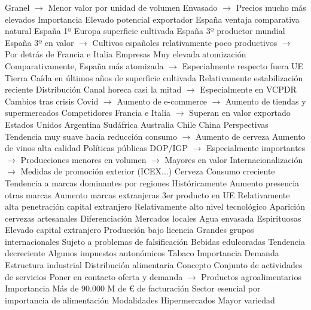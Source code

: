 \documentclass{nuevotema}
\begin{document}
\begin{esquemal}
				\4[] Granel
				\4[] $\to$ Menor valor por unidad de volumen
				\4[] Envasado
				\4[] $\to$ Precios mucho más elevados
				\4 Importancia
				\4[] Elevado potencial exportador
				\4[] España ventaja comparativa natural
				\4[] España 1º Europa superficie cultivada
				\4[] España 3º productor mundial
				\4[] España 3º en valor
				\4[] $\to$ Cultivos españoles relativamente poco productivos
				\4[] $\to$ Por detrás de Francia e Italia
				\4 Empresas
				\4[] Muy elevada atomización
				\4[] Comparativamente, España más atomizada
				\4[] $\to$ Especialmente respecto fuera UE
				\4 Tierra
				\4[] Caída en últimos años de superficie cultivada
				\4[] Relativamente estabilización reciente
				\4 Distribución
				\4[] Canal horeca casi la mitad
				\4[] $\to$ Especialmente en VCPDR
				\4[] Cambios tras crisis Covid
				\4[] $\to$ Aumento de e-commerce
				\4[] $\to$ Aumento de tiendas y supermercados
				\4 Competidores
				\4[] Francia e Italia
				\4[] $\to$ Superan en valor exportado
				\4[] Estados Unidos
				\4[] Argentina
				\4[] Sudáfrica
				\4[] Australia
				\4[] Chile
				\4[] China
				\4 Perspectivas
				\4[] Tendencia muy suave hacia reducción consumo
				\4[] $\to$ Aumento de cerveza
				\4[] Aumento de vinos alta calidad
				\4 Políticas públicas
				\4[] DOP/IGP
				\4[] $\to$ Especialmente importantes
				\4[] $\to$ Producciones menores en volumen
				\4[] $\to$ Mayores en valor
				\4[] Internacionalización
				\4[] $\to$ Medidas de promoción exterior (ICEX...)
			\3 Cerveza
				\4 Consumo creciente
				\4 Tendencia a marcas dominantes por regiones
				\4[] Históricamente
				\4 Aumento presencia otras marcas
				\4 Aumento marcas extranjeras
				\4 3er producto en UE
				\4 Relativamente alta penetración capital extranjero
				\4 Relativamente alto nivel tecnológico
				\4 Aparición cervezas artesanales
				\4[] Diferenciación
				\4[] Mercados locales
			\3 Agua envasada
			\3 Espirituosas
				\4 Elevado capital extranjero
				\4 Producción bajo licencia
				\4 Grandes grupos internacionales
				\4 Sujeto a problemas de falsificación
			\3 Bebidas edulcoradas
				\4 Tendencia decreciente
				\4 Algunos impuestos autonómicos
		\2 Tabaco
			\3 Importancia
			\3 Demanda
			\3 Estructura industrial
		\2 Distribución alimentaria
			\3 Concepto
				\4 Conjunto de actividades de servicios
				\4[] Poner en contacto oferta y demanda
				\4[] $\to$ Productos agroalimentarios
			\3 Importancia
				\4 Más de 90.000 M de € de facturación
				\4 Sector esencial por importancia de alimentación
			\3 Modalidades
				\4 Hipermercados
				\4[] Mayor variedad

\end{esquemal}
\end{document}
